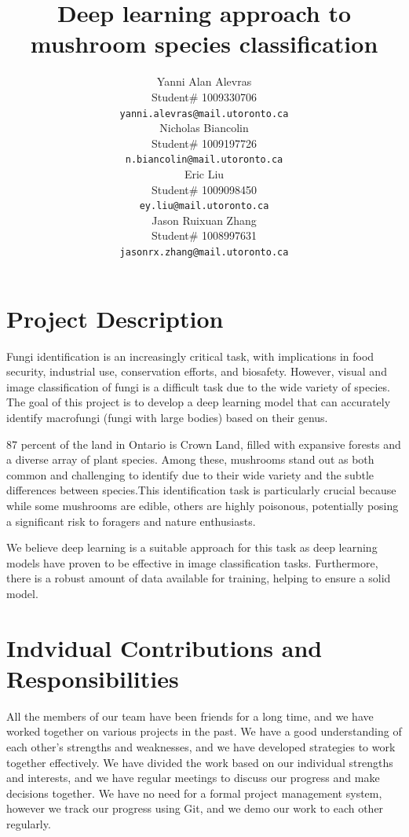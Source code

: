 \documentclass{article} %
\title{Deep learning approach to  \\ 
mushroom species classification}
\author{Yanni Alan Alevras  \\
Student\# 1009330706 \\
\texttt{yanni.alevras@mail.utoronto.ca} \\
\And
Nicholas Biancolin  \\
Student\# 1009197726 \\
\texttt{n.biancolin@mail.utoronto.ca} \\
\AND
Eric Liu  \\
Student\# 1009098450 \\
\texttt{ey.liu@mail.utoronto.ca} \\
\And
Jason Ruixuan Zhang \\
Student\# 1008997631 \\
\texttt{jasonrx.zhang@mail.utoronto.ca} \\
\AND
}
\begin{document}
\maketitle

\section{Project Description}
\label{sec:project_description}

Fungi identification is an increasingly critical task, with implications in food security, industrial use, conservation efforts, and biosafety. However, visual and image classification of fungi is a difficult task due to the wide variety of species. The goal of this project is to develop a deep learning model that can accurately identify macrofungi (fungi with large bodies) based on their genus. 

87 percent of the land in Ontario is Crown Land, filled with expansive forests and a diverse array of plant species. Among these, mushrooms stand out as both common and challenging to identify due to their wide variety and the subtle differences between species.This identification task is particularly crucial because while some mushrooms are edible, others are highly poisonous, potentially posing a significant risk to foragers and nature enthusiasts.

We believe deep learning is a suitable approach for this task as deep learning models have proven to be effective in image classification tasks. Furthermore, there is a robust amount of data available for training, helping to ensure a solid model.


\section{Indvidual Contributions and Responsibilities}
\label{sec:individual_contributions_and_responsibilities}

All the members of our team have been friends for a long time, and we have worked together on various projects in the past. We have a good understanding of each other's strengths and weaknesses, and we have developed strategies to work together effectively. We have divided the work based on our individual strengths and interests, and we have regular meetings to discuss our progress and make decisions together. We have no need for a formal project management system, however we track our progress using Git, and we demo our work to each other regularly.
\end{document}
